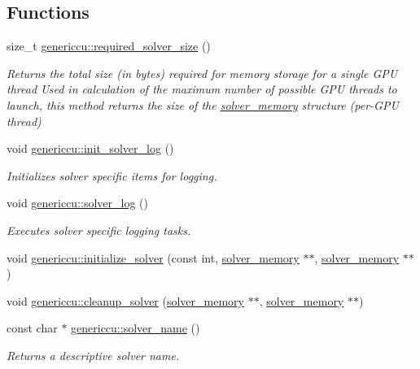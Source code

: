 \subsection*{Functions}
\begin{DoxyCompactItemize}
\item 
size\+\_\+t \hyperlink{namespacegenericcu_a95e70ae54ccfc5eb00792846ca80ecde}{genericcu\+::required\+\_\+solver\+\_\+size} ()
\begin{DoxyCompactList}\small\item\em Returns the total size (in bytes) required for memory storage for a single G\+PU thread Used in calculation of the maximum number of possible G\+PU threads to launch, this method returns the size of the \hyperlink{structsolver__memory}{solver\+\_\+memory} structure (per-\/\+G\+PU thread) \end{DoxyCompactList}\item 
void \hyperlink{namespacegenericcu_a358f079f3935e43979b5f56c1571e337}{genericcu\+::init\+\_\+solver\+\_\+log} ()
\begin{DoxyCompactList}\small\item\em Initializes solver specific items for logging. \end{DoxyCompactList}\item 
void \hyperlink{namespacegenericcu_a5decadd4be249498055f5de06892563c}{genericcu\+::solver\+\_\+log} ()
\begin{DoxyCompactList}\small\item\em Executes solver specific logging tasks. \end{DoxyCompactList}\item 
void \hyperlink{namespacegenericcu_af3d7e7d6a3b751c0fb942b20bc1ab296}{genericcu\+::initialize\+\_\+solver} (const int, \hyperlink{structsolver__memory}{solver\+\_\+memory} $\ast$$\ast$, \hyperlink{structsolver__memory}{solver\+\_\+memory} $\ast$$\ast$)
\item 
void \hyperlink{namespacegenericcu_ab44369c2115282f0907eea035ff453ad}{genericcu\+::cleanup\+\_\+solver} (\hyperlink{structsolver__memory}{solver\+\_\+memory} $\ast$$\ast$, \hyperlink{structsolver__memory}{solver\+\_\+memory} $\ast$$\ast$)
\item 
const char $\ast$ \hyperlink{namespacegenericcu_a21cc3f48896c010b61e283a6f4c82409}{genericcu\+::solver\+\_\+name} ()
\begin{DoxyCompactList}\small\item\em Returns a descriptive solver name. \end{DoxyCompactList}\end{DoxyCompactItemize}



